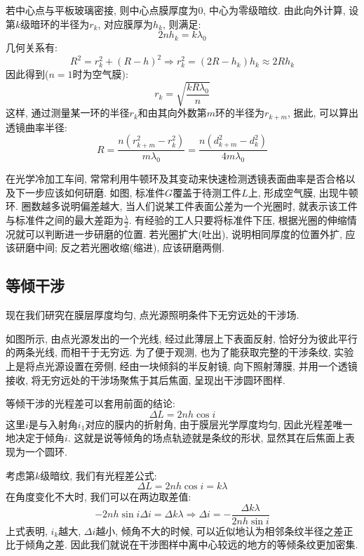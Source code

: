 若中心点与平板玻璃密接, 则中心点膜厚度为$0$, 中心为零级暗纹. 由此向外计算, 设第$k$级暗环的半径为$r_k$, 对应膜厚为$h_k$, 则满足:
\[
2nh_k = k\lambda_0
\]
几何关系有:
\[
R^2 = r_k^2+(R-h)^2 \Rightarrow r_k^2 = (2R-h_k)h_k \approx 2Rh_k
\]
因此得到($n=1$时为空气膜):
\[
r_k = \sqrt{\frac{kR\lambda_0}{n}}
\]
这样, 通过测量某一环的半径$r_k$和由其向外数第$m$环的半径为$r_{k+m}$, 据此, 可以算出透镜曲率半径:
\[
R = \frac{n(r_{k+m}^2-r_k^2)}{m\lambda_0} = \frac{n(d_{k+m}^2-d_k^2)}{4m\lambda_0}
\]


在光学冷加工车间, 常常利用牛顿环及其变动来快速检测透镜表面曲率是否合格以及下一步应该如何研磨. 如图, 标准件$G$覆盖于待测工件$L$上, 形成空气膜, 出现牛顿环. 圈数越多说明偏差越大, 当人们说某工件表面公差为一个光圈时, 就表示该工件与标准件之间的最大差距为$\frac{\lambda}{2}$. 有经验的工人只要将标准件下压, 根据光圈的伸缩情况就可以判断进一步研磨的位置. 若光圈扩大(吐出), 说明相同厚度的位置外扩, 应该研磨中间; 反之若光圈收缩(缩进), 应该研磨两侧.

\subsection{等倾干涉}

现在我们研究在膜层厚度均匀, 点光源照明条件下无穷远处的干涉场.


如图所示, 由点光源发出的一个光线, 经过此薄层上下表面反射, 恰好分为彼此平行的两条光线, 而相干于无穷远. 为了便于观测, 也为了能获取完整的干涉条纹, 实验上是将点光源设置在旁侧, 经由一块倾斜的半反射镜, 向下照射薄膜, 并用一个透镜接收, 将无穷远处的干涉场聚焦于其后焦面, 呈现出干涉圆环图样.


等倾干涉的光程差可以套用前面的结论:
\[
\Delta L = 2nh\cos i
\]
这里$i$是与入射角$i_1$对应的膜内的折射角, 由于膜层光学厚度均匀, 因此光程差唯一地决定于倾角$i$. 这就是说等倾角的场点轨迹就是条纹的形状, 显然其在后焦面上表现为一个圆环.

考虑第$k$级暗纹, 我们有光程差公式:
\[
\Delta L = 2nh\cos i = k\lambda
\]
在角度变化不大时, 我们可以在两边取差值:
\[
-2nh\sin i \Delta i = \Delta k \lambda \Rightarrow \Delta i = -\frac{\Delta k \lambda}{2nh\sin i}
\]
上式表明, $i_k$越大, $\Delta i$越小, 倾角不大的时候, 可以近似地认为相邻条纹半径之差正比于倾角之差. 因此我们就说在干涉图样中离中心较远的地方的等倾条纹更加密集.

